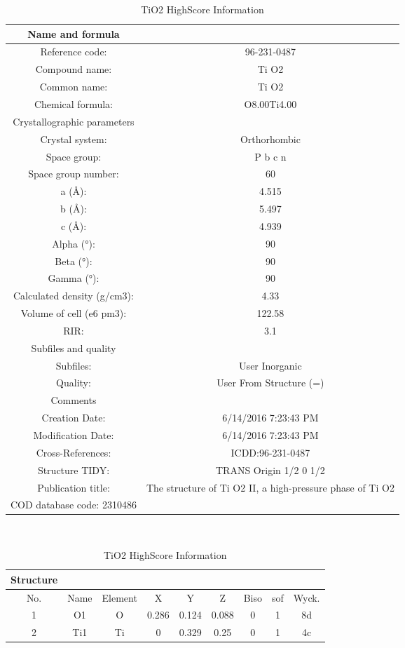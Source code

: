\documentclass[11pt]{article}
\begin{document}
	\begin{table}[htbp]
		\centering
		\caption{TiO2 HighScore Information}
		\begin{tabular}{cc}
			\toprule
			Name and formula &  \\
			\midrule
			Reference code: & 96-231-0487 \\
			Compound name: & Ti O2 \\
			Common name: & Ti O2 \\
			Chemical formula: & O8.00Ti4.00 \\
			\midrule
			Crystallographic parameters &  \\
			\midrule
			Crystal system: & Orthorhombic \\
			Space group: & P b c n \\
			Space group number: & 60 \\
			a (Å): & 4.515 \\
			b (Å): & 5.497 \\
			c (Å): & 4.939 \\
			Alpha (°): & 90 \\
			Beta (°): & 90 \\
			Gamma (°): & 90 \\
			Calculated density (g/cm3): & 4.33 \\
			Volume of cell (e6 pm3): & 122.58 \\
			RIR: & 3.1 \\
			\midrule
			Subfiles and quality &  \\
			\midrule
			Subfiles: & User Inorganic \\
			Quality: & User From Structure (=) \\
			Comments &  \\
			Creation Date: & 6/14/2016 7:23:43 PM \\
			Modification Date: & 6/14/2016 7:23:43 PM \\
			Cross-References: & ICDD:96-231-0487 \\
			Structure TIDY: & TRANS  Origin  1/2 0 1/2 \\
			Publication title: & The structure of Ti O2 II, a high-pressure phase of Ti O2 \\
			COD database code: 2310486 &  \\
			\bottomrule
		\end{tabular}%
		\\
		\begin{tabular}{ccccccccc}
			\toprule
			Structure &   &   &   &   &   &   &   &  \\
			\midrule
			No. & Name & Element & X & Y & Z & Biso & sof & Wyck. \\
			\midrule
			1 & O1 & O & 0.286 & 0.124 & 0.088 & 0 & 1 & 8d \\
			2 & Ti1 & Ti & 0 & 0.329 & 0.25 & 0 & 1 & 4c \\
			\bottomrule
		\end{tabular}%
		\label{tab:TiO2_Appendix}%
	\end{table}%
	
\end{document}

